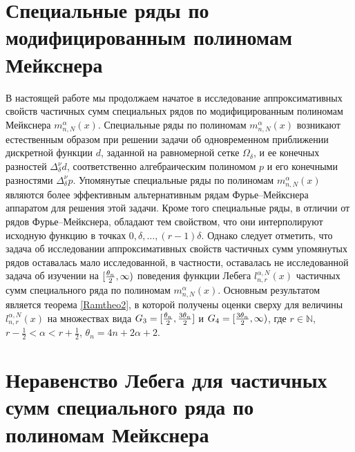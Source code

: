 \section{Специальные ряды по модифицированным полиномам Мейкснера}
В настоящей работе мы продолжаем начатое в \cite{RamVMJ} исследование аппроксимативных свойств
частичных сумм специальных рядов по модифицированным полиномам Мейкснера $m_{n,N}^\alpha(x)$.
Специальные ряды по полиномам $m_{n,N}^\alpha(x)$ возникают естественным образом при решении задачи об одновременном приближении дискретной функции $d$, заданной на равномерной сетке $\Omega_\delta$, и ее конечных разностей $\Delta^\nu_\delta d$, соответственно алгебраическим полиномом $p$ и его конечными разностями $\Delta^\nu_\delta p$. Упомянутые специальные ряды по полиномам $m_{n,N}^\alpha(x)$ являются более эффективным альтернативным рядам Фурье--Мейкснера аппаратом для решения этой задачи. Кроме того специальные ряды, в отличии от рядов Фурье--Мейкснера, обладают тем свойством, что они интерполируют исходную функцию в точках $0, \delta, \ldots, (r-1)\delta$.
Однако следует отметить, что задача об исследовании аппроксимативных свойств частичных сумм упомянутых рядов оставалась мало исследованной, в частности, оставалась не исследованной задача об изучении на $[{\theta_n\over 2},\infty)$  поведения функции Лебега $l_{n,r}^{\alpha,N}(x)$ частичных сумм специального ряда по полиномам $m_{n,N}^\alpha(x)$. Основным результатом является теорема \ref{Ramtheo2}, в которой получены оценки сверху для величины $l_{n,r}^{\alpha,N}(x)$ на множествах вида $G_3=[{\theta_n\over 2},{3\theta_n\over 2}]$ и $G_4=[{3\theta_n\over 2},\infty)$, где $r\in\mathbb{N}$, $r-\frac{1}{2}<\alpha<r+\frac{1}{2}$, $\theta_n=4n+2\alpha+2$.

\section{Неравенство Лебега для частичных сумм специального ряда по полиномам Мейкснера}

